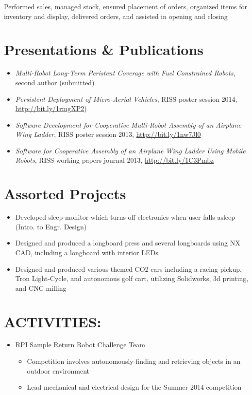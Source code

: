 \begin{resume}
  {
   	\item Performed sales, managed stock, ensured placement of orders, organized items for
					inventory and display, delivered orders, and assisted in opening and closing
  }
\normalsize{\section{Presentations \& Publications}}
\begin{itemize}
  \item \emph{Multi-Robot Long-Term Peristent Coverage with Fuel Constrained
    Robots}, second author (submitted)
  \item \emph{Persistent Deployment of Micro-Aerial Vehicles}, RISS poster
    session 2014, \url{http://bit.ly/1rmgXP2})
  \item \emph{Software Development for Cooperative Multi-Robot Assembly of an
    Airplane Wing Ladder}, RISS poster session 2013, \url{http://bit.ly/1nw7Jl0}
  \item \emph{Software for Cooperative Assembly of an Airplane Wing Ladder Using
    Mobile Robots}, RISS working papers journal 2013, \url{http://bit.ly/1C3Pmbz}
\end{itemize}

\normalsize{\section{Assorted Projects}}
\begin{itemize}
  \item Developed sleep-monitor which turns off electronics when user falls asleep (Intro. to Engr. Design)
  \item Designed and produced a longboard press and several longboards using NX CAD, including a longboard
        with interior LEDs
  \item Designed and produced various themed CO2 cars including a racing pickup, Tron Light-Cycle,
        and autonomous golf cart, utilizing Solidworks, 3d printing, and CNC milling
\end{itemize}
\section{ACTIVITIES:}
	\begin{itemize}
    \item RPI Sample Return Robot Challenge Team
    \begin{itemize}
      \item Competition involves autonomously finding and retrieving objects in an outdoor environment
      \item Lead mechanical and electrical design for the Summer 2014 competition
    \end{itemize}
	\end{itemize}
\end{resume} 

